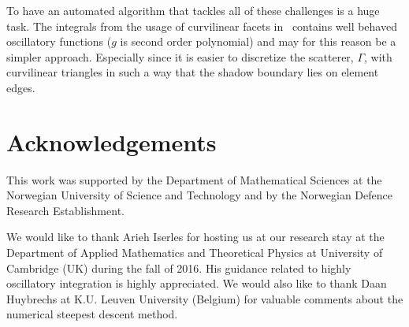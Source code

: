 To have an automated algorithm that tackles all of these challenges is a huge task. The integrals from the usage of curvilinear facets in~\cite{Lavia2018mhf} contains well behaved oscillatory functions ($g$ is second order polynomial) and may for this reason be a simpler approach. Especially since it is easier to discretize the scatterer, $\Gamma$, with curvilinear triangles in such a way that the shadow boundary lies on element edges.

\section*{Acknowledgements}
This work was supported by the Department of Mathematical Sciences at the Norwegian University of Science and Technology and by the Norwegian Defence Research Establishment.

We would like to thank Arieh Iserles for hosting us at our research stay at the Department of Applied Mathematics and Theoretical Physics at University of Cambridge (UK) during the fall of 2016. His guidance related to highly oscillatory integration is highly appreciated. We would also like to thank Daan Huybrechs at K.U. Leuven University (Belgium) for valuable comments about the numerical steepest descent method. 
